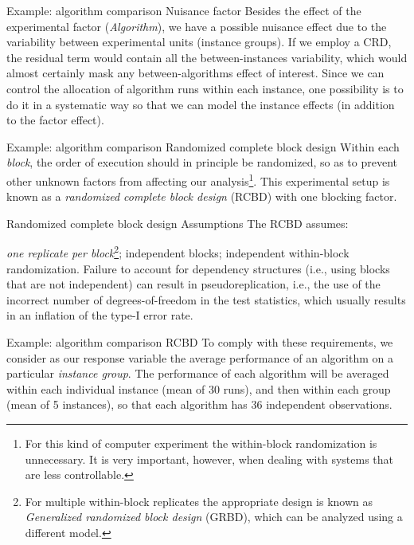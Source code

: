 \documentclass[t]{beamer}
\begin{document}

\begin{ftst}
{Example: algorithm comparison}
{Nuisance factor}
Besides the effect of the experimental factor (\textit{Algorithm}), we have a possible nuisance effect due to the variability between experimental units (instance groups).
\vone
If we employ a CRD, the residual term would contain all the between-instances variability, which would almost certainly mask any between-algorithms effect of interest.
\vone
Since we can control the allocation of algorithm runs within each instance, one possibility is to do it in a systematic way so that we can model the instance effects (in addition to the factor effect).
\end{ftst}


\begin{ftst}
{Example: algorithm comparison}
{Randomized complete block design}
Within each \textit{block}, the order of execution should in principle be randomized, so as to prevent other unknown factors from affecting our analysis\footnote[2]{\tiny For this kind of computer experiment the within-block randomization is unnecessary. It is very important, however, when dealing with systems that are less controllable.}. 
\vone
This experimental setup is known as a \textit{randomized complete block design} (RCBD) with one blocking factor.
\end{ftst}


\begin{ftst}
{Randomized complete block design}
{Assumptions}
The RCBD assumes:

\bitems \textit{one replicate per block}\footnote[3]{\tiny For multiple within-block replicates the appropriate design is known as \textit{Generalized randomized block design} (GRBD), which can be analyzed using a different model.};
\spitem independent blocks;
\spitem independent within-block randomization. 
\eitem
\vhalf
Failure to account for dependency structures (i.e., using blocks that are not independent) can result in pseudoreplication, i.e., the use of the incorrect number of degrees-of-freedom in the test statistics, which usually results in an inflation of the type-I error rate.
\end{ftst}


\begin{ftst}
{Example: algorithm comparison}
{RCBD}
To comply with these requirements, we consider as our response variable the average performance of an algorithm on a particular \textit{instance group}.
\vone
The performance of each algorithm will be averaged within each individual instance (mean of 30 runs), and then within each group (mean of 5 instances), so that each algorithm has 36 independent observations.
\end{ftst}
\end{document}
